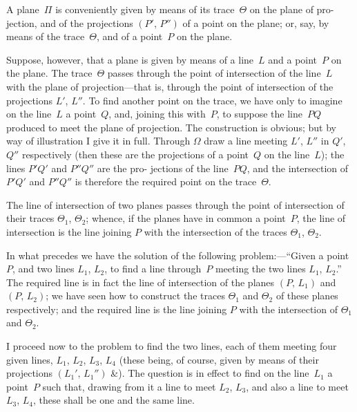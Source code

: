 \documentclass[11pt,a4paper]{article}
\theoremstyle{plain}
\theoremstyle{definition}
\begin{document}
A plane~$\Pi$ is conveniently given by means of its trace~$\Theta$ on the plane of pro-
jection, and of the projections $(P',\,P'')$ of a point on the plane; or, say, by means
of the trace~$\Theta$, and of a point~$P$ on the plane.

Suppose, however, that a plane is given by means of a line~$L$ and a point~$P$
on the plane.  The trace~$\Theta$ passes through the point of intersection of the line~$L$ with
the plane of projection---that is, through the point of intersection of the projections
$L'$, $L''$.  To find another point on the trace, we have only to imagine on the line~$L$
a point~$Q$, and, joining this with~$P$, to suppose the line~$PQ$ produced to meet the
plane of projection.  The construction is obvious; but by way of illustration I give it
in full.  Through $\Omega$ draw a line meeting $L'$, $L''$ in $Q'$, $Q''$ respectively (then these are
the projections of a point~$Q$ on the line~$L$); the lines $P'Q'$ and $P''Q''$ are the pro-
jections of the line~$PQ$, and the intersection of $P'Q'$ and $P''Q''$ is therefore the required
point on the trace~$\Theta$.

The line of intersection of two planes passes through the point of intersection of
their traces $\Theta_1$, $\Theta_2$; whence, if the planes have in common a point~$P$, the line of
intersection is the line joining $P$ with the intersection of the traces $\Theta_1$, $\Theta_2$.

In what precedes we have the solution of the following problem:---``Given a point
$P$, and two lines $L_1$, $L_2$, to find a line through~$P$ meeting the two lines $L_1$, $L_2$.''  The
required line is in fact the line of intersection of the planes $(P,\,L_1)$ and $(P,\,L_2)$; we
have seen how to construct the traces $\Theta_1$ and $\Theta_2$ of these planes respectively; and
the required line is the line joining $P$ with the intersection of $\Theta_1$ and $\Theta_2$.

I proceed now to the problem to find the two lines, each of them meeting four
given lines, $L_1$, $L_2$, $L_3$, $L_4$ (these being, of course, given by means of their projections
$(L_1',\,L_1'')$ \&).  The question is in effect to find on the line~$L_1$ a point~$P$ such that,
drawing from it a line to meet $L_2$, $L_3$, and also a line to meet $L_3$, $L_4$, these shall
be one and the same line.
\end{document}
